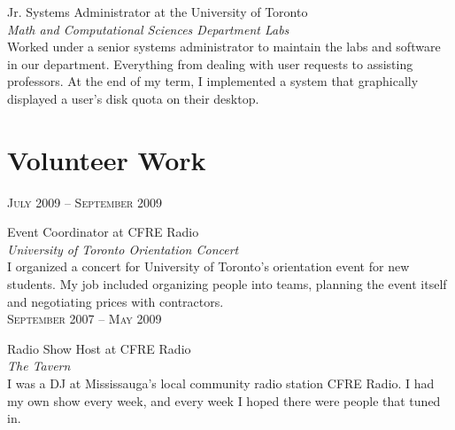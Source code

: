 \documentclass[10pt]{article}
\begin{document}
\begin{minipage}[t]{0.5\textwidth}
    \raggedright\large Jr. Systems Administrator at the University of Toronto\\
    \emph{Math and Computational Sciences Department Labs}\\[5pt]

    \normalsize{Worked under a senior systems administrator to maintain the
    labs and software in our department. Everything from dealing with user
    requests to assisting professors. At the end of my term, I implemented a
    system that graphically displayed a user's disk quota on their desktop.
    }\\[10pt]

\section{Volunteer Work}
    \raggedleft
    \textsc{\normalsize July 2009 -- September 2009}\par

    \raggedright\large Event Coordinator at CFRE Radio\\
    \emph{University of Toronto Orientation Concert}\\[5pt]

    \normalsize{I organized a concert for University of Toronto's orientation
    event for new students. My job included organizing people into teams, 
    planning the event itself and negotiating prices with contractors.}\\[10pt]

    \raggedleft
    \textsc{\normalsize September 2007 -- May 2009}\par

    \raggedright\large Radio Show Host at CFRE Radio\\
    \emph{The Tavern}\\[5pt]

    \normalsize{I was a DJ at Mississauga's local community radio station
    CFRE Radio. I had my own show every week, and every week I hoped there
    were people that tuned in.}\\[10pt]

\end{minipage}
\hfill
\end{document}
